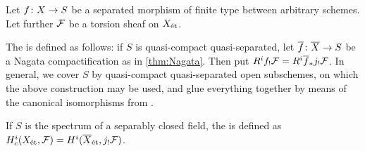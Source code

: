 \documentclass[a4paper, 10pt, oneside, DIV=9, chapterprefix=true, numbers=enddot, bibliography=totoc]{scrbook}
\begin{document}
\begin{defi}\label{def:f_!}
	Let $f\colon X\morphism S$ be a separated morphism of finite type between arbitrary schemes. Let further $\mathcal{F}$ be a torsion sheaf on $X_{\mathrm{\acute{e}t}}$.
	\begin{alphanumerate}
		\item The  is defined as follows: if $S$ is quasi-compact quasi-separated, let $\ov{f}\colon \ov{X}\morphism S$ be a Nagata compactification as in \cref{thm:Nagata}. Then put $R^if_!\Ff=R^i\ov{f}_*j_!\Ff$. In general, we cover $S$ by quasi-compact quasi-separated open subschemes, on which the above construction may be used, and glue everything together by means of the canonical isomorphisms from \itememph{\boxtimes}.
		\item If $S$ is the spectrum of a separably closed field, the  is defined as $H_c^i(X_\et,\Ff)=H^i(\ov{X}_\et,j_!\Ff)$.
	\end{alphanumerate}
\end{defi}
\end{document}
